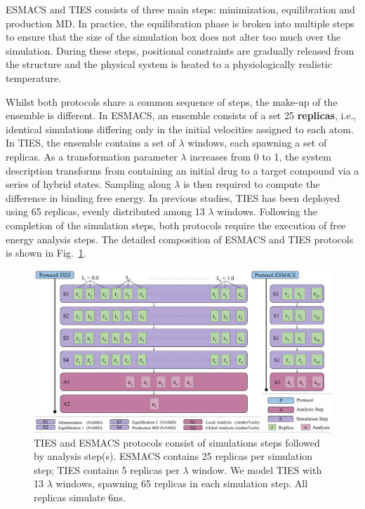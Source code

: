 ESMACS and TIES consists of three main steps: minimization, equilibration and
production MD. In practice, the equilibration phase is broken into multiple
steps to ensure that the size of the simulation box does not alter too much
over the simulation. During these steps, positional constraints are gradually
released from the structure and the physical system is heated to a
physiologically realistic temperature.

Whilst both protocols share a common sequence of steps, the make-up of the
ensemble is different. In ESMACS, an ensemble consists of a set 25
\textbf{replicas}, i.e., identical simulations differing only in the initial
velocities assigned to each atom. In TIES, the ensemble contains a set of
\textbf{$\lambda$} windows, each spawning a set of replicas. As a
transformation parameter $\lambda$ increases from 0 to 1, the system
description transforms from containing an initial drug to a target compound
via a series of hybrid states. Sampling along $\lambda$ is then required to
compute the difference in binding free energy. In previous studies, TIES has
been deployed using 65 replicas, evenly distributed among 13 $\lambda$
windows. Following the completion of the simulation steps, both protocols
require the execution of free energy analysis steps. The detailed composition
of ESMACS and TIES protocols is shown in
Fig.~\ref{fig:ties_esmacs_application}.

\begin{figure}
  \centering
  \includegraphics[width=\columnwidth]{figures/ties_esmacs_application_model.pdf}
  \caption{TIES and ESMACS protocols consist of simulations steps followed by
  analysis step(s). ESMACS contains 25 replicas per simulation step; TIES
  contains %
  5 replicas per $\lambda$ window. We model TIES with 13 $\lambda$
  windows, spawning 65 replicas in each simulation step. All replicas
  simulate 6ns.}\label{fig:ties_esmacs_application}
\up{}
\up{}
\end{figure}

